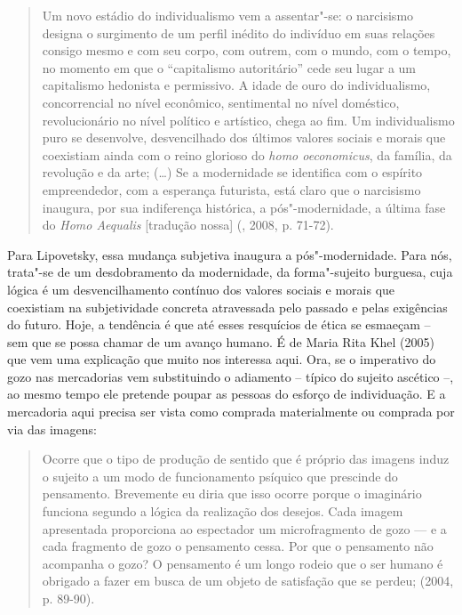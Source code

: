 {\begin{quote}
Um novo estádio do individualismo vem a assentar"-se: o narcisismo
designa o surgimento de um perfil inédito do indivíduo em suas relações
consigo mesmo e com seu corpo, com outrem, com o mundo, com o tempo, no
momento em que o ``capitalismo autoritário'' cede seu lugar a um
capitalismo hedonista e permissivo. A idade de ouro do individualismo,
concorrencial no nível econômico, sentimental no nível doméstico,
revolucionário no nível político e artístico, chega ao fim. Um
individualismo puro se desenvolve, desvencilhado dos últimos valores
sociais e morais que coexistiam ainda com o reino glorioso do \emph{homo
oeconomicus}, da família, da revolução e da arte; (\ldots{}) Se a modernidade
se identifica com o espírito empreendedor, com a esperança futurista,
está claro que o narcisismo inaugura, por sua indiferença histórica, a
pós"-modernidade, a última fase do \emph{Homo Aequalis} [tradução
nossa] (, 2008, p. 71-72).
\end{quote}

Para Lipovetsky, essa mudança subjetiva inaugura a pós"-modernidade. Para
nós, trata"-se de um desdobramento da modernidade, da forma"-sujeito
burguesa, cuja lógica é um desvencilhamento contínuo dos valores sociais
e morais que coexistiam na subjetividade concreta atravessada pelo
passado e pelas exigências do futuro. Hoje, a tendência é que até esses
resquícios de ética se esmaeçam -- sem que se possa chamar de um avanço
humano. É de Maria Rita Khel (2005) que vem uma explicação que muito nos
interessa aqui. Ora, se o imperativo do gozo nas mercadorias vem
substituindo o adiamento -- típico do sujeito ascético --, ao mesmo
tempo ele pretende poupar as pessoas do esforço de individuação. E a
mercadoria aqui precisa ser vista como comprada materialmente ou
comprada por via das imagens:

\begin{quote}
Ocorre que o tipo de produção de sentido que é próprio das imagens induz
o sujeito a um modo de funcionamento psíquico que prescinde do
pensamento. Brevemente eu diria que isso ocorre porque o imaginário
funciona segundo a lógica da realização dos desejos. Cada imagem
apresentada proporciona ao espectador um microfragmento de gozo --- e a
cada fragmento de gozo o pensamento cessa. Por que o pensamento não
acompanha o gozo? O pensamento é um longo rodeio que o ser humano é
obrigado a fazer em busca de um objeto de satisfação que se perdeu;
(2004, p. 89-90).
\end{quote}

}
